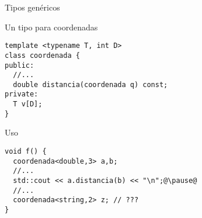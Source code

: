 \begin{frame}[t,fragile]{Tipos genéricos}
\vspace{-1em}
\begin{block}{Un tipo para coordenadas}
\vspace{-0.25em}
\begin{lstlisting}
template <typename T, int D>
class coordenada {
public:
  //...
  double distancia(coordenada q) const;
private:
  T v[D];
}
\end{lstlisting}
\vspace{-1em}
\end{block}

\vfill\pause
\begin{block}{Uso}
\vspace{-0.25em}
\begin{lstlisting}[escapechar=@]
void f() {
  coordenada<double,3> a,b;
  //...
  std::cout << a.distancia(b) << "\n";@\pause@
  //...
  coordenada<string,2> z; // ???
}
\end{lstlisting}
\end{block}
\end{frame}
